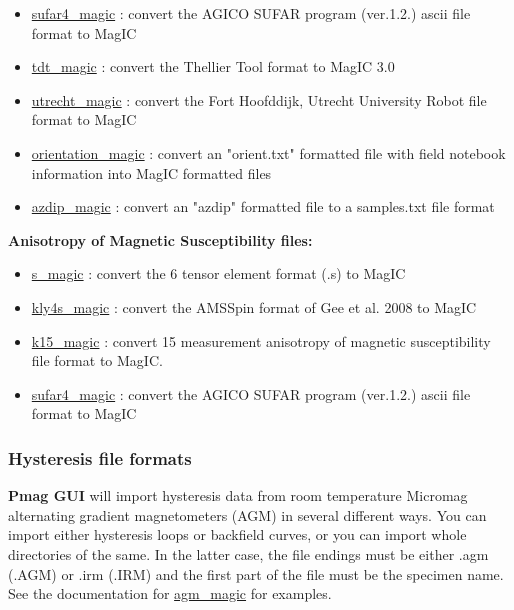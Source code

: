\documentclass[11pt]{book}
\begin{document}
{{\begin{itemize}
\item \href{http://pmagpy.github.io/PmagPy.html#sufar4_magic}{sufar4\_magic} : convert the AGICO SUFAR program (ver.1.2.) ascii file format to MagIC
\item \href{http://pmagpy.github.io/PmagPy.html#tdt_magic}{tdt\_magic} : convert the Thellier Tool format to MagIC 3.0
\item \href{http://pmagpy.github.io/PmagPy.html#utrecht_magic}{utrecht\_magic} : convert the Fort Hoofddijk, Utrecht University Robot file format to MagIC
\item \href{http://pmagpy.github.io/PmagPy.html#orientation_magic}{orientation\_magic} : convert an "orient.txt" formatted file with field notebook information into MagIC formatted files
\item \href{http://pmagpy.github.io/PmagPy.html#azdip_magic}{azdip\_magic} : convert an "azdip" formatted file to a samples.txt file format
\end{itemize}



{\bf Anisotropy of Magnetic Susceptibility files:}

\begin{itemize}
\item \href{http://pmagpy.github.io/PmagPy.html#s_magic}{s\_magic} : convert the 6 tensor element format (.s) to MagIC
\item \href{http://pmagpy.github.io/PmagPy.html#kly4s_magic}{kly4s\_magic} : convert the AMSSpin format of Gee et al. 2008 to MagIC
\item \href{http://pmagpy.github.io/PmagPy.html#k15_magic}{k15\_magic} : convert  15 measurement anisotropy of magnetic susceptibility file format to MagIC. \nocite{tauxe98}
\item \href{http://pmagpy.github.io/PmagPy.html#sufar4_magic}{sufar4\_magic} : convert the AGICO SUFAR program (ver.1.2.) ascii file format to MagIC

\end{itemize}


\subsubsection{Hysteresis file formats}
{\bf Pmag GUI} will import hysteresis data from room temperature  Micromag alternating gradient magnetometers (AGM)  in several different ways.  You can import either hysteresis loops or backfield curves, or you can import whole directories of the same.  In the latter case, the file endings must be either .agm (.AGM) or .irm (.IRM) and the first part of the file must be the specimen name.
 See the documentation for  \href{http://pmagpy.github.io/PmagPy.html#agm_magic}{agm\_magic} for examples.


}}
\end{document}
